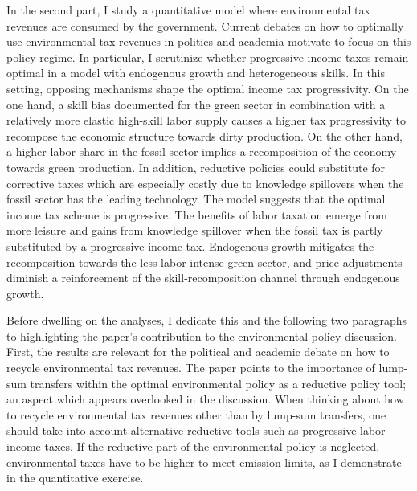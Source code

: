 In the second part,  I study a quantitative model where environmental tax revenues are consumed by the government. Current debates on how to optimally use environmental tax revenues in politics \citep{Baker2017TheDividends} and academia \citep[e.g.][]{Fried2018TheGenerations, Carattini2018} motivate to focus on this policy regime. 
In particular, I scrutinize whether progressive income taxes remain optimal in a model with endogenous growth and heterogeneous skills.
In this setting, opposing mechanisms shape the optimal income tax progressivity. On the one hand, a skill bias documented for the green sector \citep{Consoli2016DoCapital} in combination with a relatively more elastic high-skill labor supply causes a higher tax progressivity to recompose the economic structure towards dirty production. On the other hand, a higher labor share in the fossil sector implies a recomposition of the economy towards green production.
 In addition, reductive policies could substitute for corrective taxes  which are especially costly due to knowledge spillovers when the fossil sector has the leading technology. %
 The model suggests that the optimal income tax scheme is progressive. The benefits of labor taxation emerge from more leisure and gains from knowledge spillover when the fossil tax is partly substituted by a progressive income tax. Endogenous growth mitigates the recomposition towards the less labor intense green sector, and  price adjustments diminish a reinforcement of the skill-recomposition channel through endogenous growth. 
 

Before dwelling on the analyses, I dedicate this and the following two paragraphs to highlighting the paper's contribution to the environmental policy discussion. 
First, the results are relevant for the political and academic debate on how  to recycle environmental tax revenues. The paper points to the importance of lump-sum transfers within the optimal environmental policy as a reductive policy tool; an aspect which appears overlooked in the discussion.%
When thinking about how to recycle environmental tax revenues other than by lump-sum transfers,  one should take into account alternative reductive tools such as progressive labor income taxes. 
If the reductive part of the environmental policy is neglected, environmental taxes have to be higher to meet emission limits, as I demonstrate in the quantitative exercise.

